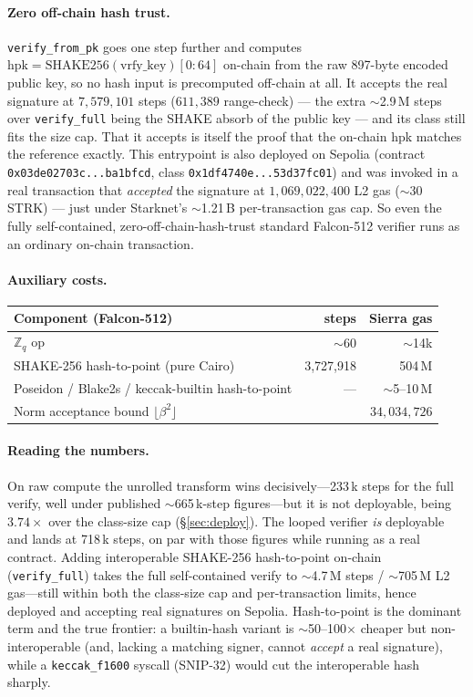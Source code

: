 \documentclass[11pt]{article}
\newcommand{\Zq}{\mathbb{Z}_q}
\begin{document}
\paragraph{Zero off-chain hash trust.} \texttt{verify\_from\_pk} goes one step further and computes
$\text{hpk}=\text{SHAKE256}(\text{vrfy\_key})[0{:}64]$ on-chain from the raw 897-byte encoded public
key, so no hash input is precomputed off-chain at all. It accepts the real signature at
$7{,}579{,}101$ steps ($611{,}389$ range-check) --- the extra $\sim$2.9\,M steps over
\texttt{verify\_full} being the SHAKE absorb of the public key --- and its class still fits the
size cap. That it accepts is itself the proof that the on-chain hpk matches the reference exactly.
This entrypoint is also deployed on Sepolia (contract
\texttt{0x03de02703c...ba1bfcd}, class \texttt{0x1df4740e...53d37fc01}) and was invoked in a real
transaction that \emph{accepted} the signature at $1{,}069{,}022{,}400$ L2 gas ($\sim$30 STRK) ---
just under Starknet's $\sim$1.21\,B per-transaction gas cap. So even the fully self-contained,
zero-off-chain-hash-trust standard Falcon-512 verifier runs as an ordinary on-chain transaction.

\paragraph{Auxiliary costs.}
\begin{center}
\begin{tabular}{lrr}
\toprule
Component (Falcon-512) & steps & Sierra gas \\
\midrule
$\Zq$ op & $\sim$60 & $\sim$14k \\
SHAKE-256 hash-to-point (pure Cairo) & 3{,}727{,}918 & 504\,M \\
Poseidon / Blake2s / keccak-builtin hash-to-point & --- & $\sim$5--10\,M \\
Norm acceptance bound $\lfloor\beta^2\rfloor$ & \multicolumn{2}{r}{$34{,}034{,}726$} \\
\bottomrule
\end{tabular}
\end{center}

\paragraph{Reading the numbers.} On raw compute the unrolled transform wins decisively---233\,k
steps for the full verify, well under published $\sim$665\,k-step figures---but it is not
deployable, being $3.74\times$ over the class-size cap (\S\ref{sec:deploy}). The looped verifier
\emph{is} deployable and lands at 718\,k steps, on par with those figures while running as a real
contract. Adding interoperable SHAKE-256 hash-to-point on-chain (\texttt{verify\_full}) takes the
full self-contained verify to $\sim$4.7\,M steps / $\sim$705\,M L2 gas---still within both the
class-size cap and per-transaction limits, hence deployed and accepting real signatures on Sepolia.
Hash-to-point is the dominant term and the true frontier: a builtin-hash variant is
$\sim$50--100$\times$ cheaper but non-interoperable (and, lacking a matching signer, cannot
\emph{accept} a real signature), while a \texttt{keccak\_f1600} syscall (SNIP-32) would cut the
interoperable hash sharply.
\end{document}
